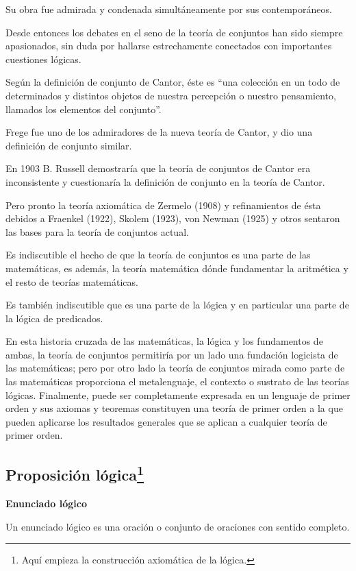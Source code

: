 Su obra fue admirada y condenada simultáneamente por sus contemporáneos.

Desde entonces los debates en el seno de la teoría de conjuntos han
sido siempre apasionados, sin duda por hallarse estrechamente conectados
con importantes cuestiones lógicas. 

Según la definición de conjunto de Cantor, éste es “una colección
en un todo de determinados y distintos objetos de nuestra percepción
o nuestro pensamiento, llamados los elementos del conjunto”.

Frege fue uno de los admiradores de la nueva teoría de Cantor, y dio
una definición de conjunto similar. 

En 1903 B. Russell demostraría que la teoría de conjuntos de Cantor
era inconsistente y cuestionaría la definición de conjunto en la teoría
de Cantor.

Pero pronto la teoría axiomática de Zermelo (1908) y refinamientos
de ésta debidos a Fraenkel (1922), Skolem (1923), von Newman (1925)
y otros sentaron las bases para la teoría de conjuntos actual.

Es indiscutible el hecho de que la teoría de conjuntos es una parte
de las matemáticas, es además, la teoría matemática dónde fundamentar
la aritmética y el resto de teorías matemáticas.

Es también indiscutible que es una parte de la lógica y en particular
una parte de la lógica de predicados. 

En esta historia cruzada de las matemáticas, la lógica y los fundamentos
de ambas, la teoría de conjuntos permitiría por un lado una fundación
logicista de las matemáticas; pero por otro lado la teoría de conjuntos
mirada como parte de las matemáticas proporciona el metalenguaje,
el contexto o sustrato de las teorías lógicas. Finalmente, puede ser
completamente expresada en un lenguaje de primer orden y sus axiomas
y teoremas constituyen una teoría de primer orden a la que pueden
aplicarse los resultados generales que se aplican a cualquier teoría
de primer orden.

\subsection{Proposición lógica\protect\footnote{Aquí empieza la construcción axiomática de la lógica.}}

\begin{ideabox}{\bf Enunciado lógico}\textsf{ }

\textsf{Un enunciado lógico} es una oración o conjunto de oraciones
con sentido completo.\end{ideabox} 

